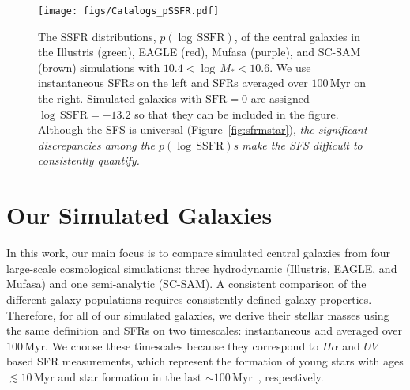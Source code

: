 \documentclass[preprint2,tighten]{aastex62}
\begin{document}
\begin{figure}
\begin{center}
\texttt{[image: figs/Catalogs\_pSSFR.pdf]} 
\caption{The SSFR distributions, $p(\log\,\mathrm{SSFR})$, of the 
central galaxies in the Illustris (green), EAGLE (red), 
{\sc Mufasa} (purple), and  SC-SAM (brown) simulations with 
$10.4 < \log\,M_* < 10.6$. We use instantaneous SFRs on the left
and SFRs averaged over $100\,\mathrm{Myr}$ on the right. Simulated
galaxies with $\mathrm{SFR}{=}0$ are assigned $\log\,\mathrm{SSFR}{=}-13.2$ 
so that they can be included in the figure. Although the SFS is 
universal (Figure~\ref{fig:sfrmstar}), \emph{the significant 
discrepancies among the $p(\log\,\mathrm{SSFR})$s make the SFS 
difficult to consistently quantify.}} \label{fig:pssfr}
\end{center}
\end{figure}

\section{Our Simulated Galaxies} \label{sec:galsims}%
In this work, our main focus is to compare simulated central galaxies 
from four large-scale cosmological simulations: three hydrodynamic 
(Illustris, EAGLE, and {\sc Mufasa}) and one semi-analytic (SC-SAM). 
A consistent comparison of the different galaxy populations requires 
consistently defined galaxy properties. Therefore, for all of our 
simulated galaxies, we derive their stellar masses using the same 
definition and SFRs on two timescales: instantaneous and averaged over 
$100\,\mathrm{Myr}$. We choose these timescales because they correspond
to $H{\alpha}$ and $UV$ based SFR measurements, which represent the 
formation of young stars with ages ${\lesssim}10\,\mathrm{Myr}$ 
and star formation in the last ${\sim}100\,\mathrm{Myr}$~\citep[e.g.][]{kennicutt2012}, 
respectively. 
\end{document}
